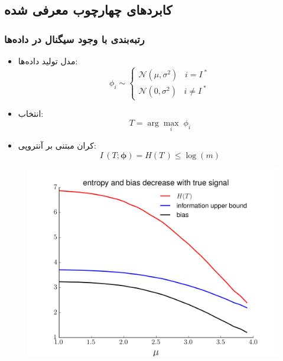 \documentclass[]{beamer}
\makeatletter
\newcommand{ \RTList}{\raggedleft\rightskip\@totalleftmargin}
\makeatother
\begin{document}
\begin{persian}
\section{کابرد‌های چهارچوب معرفی شده}
\begin{frame}
\frametitle{رتبه‌بندی با وجود سیگنال در داده‌ها}
\noindent
\begin{minipage}[t]{0.48\linewidth}
\begin{itemize}\RTList
	\item
	مدل تولید داده‌ها:
	\hspace{1.2cm}
	\hfill
	\begin{equation*}
	\phi_i \sim
	\begin{cases}
	\mathcal{N}(\mu, \sigma^2)\;\;\; i = I^{\;*}\\
	\mathcal{N}(0, \sigma^2)\;\;\; i \neq I^{\;*}
	\end{cases}
	\end{equation*}
	\item
	انتخاب:
		$$T = \arg\max_{i} \; \phi_i$$
	\item
کران مبتنی بر آنتروپی:
	\hspace{0.3cm}
	$$I\,(T; \bm{\phi}) = H(T\,) \leq \log(m)$$
	
\end{itemize}
\end{minipage}%
\begin{minipage}[t]{0.5\linewidth}
\begin{figure}
	\includegraphics[scale=0.35]{fig_1.png}
\end{figure}
\end{minipage}
\end{frame}



\end{persian}
\end{document}
